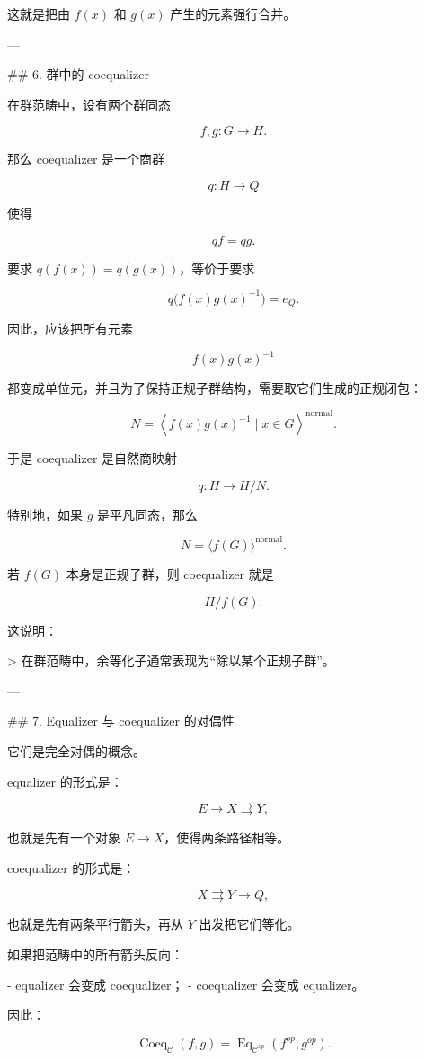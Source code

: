 \documentclass{ctexart}
\newcommand{\normal}{\mathrm{normal}}
\begin{document}
\begin{markdown}
这就是把由 $f(x)$ 和 $g(x)$ 产生的元素强行合并。

---

## 6. 群中的 coequalizer

在群范畴中，设有两个群同态

$$
f,g:G\to H.
$$

那么 coequalizer 是一个商群

$$
q:H\to Q
$$

使得

$$
qf=qg.
$$

要求 $q(f(x))=q(g(x))$，等价于要求

$$
q\bigl(f(x)g(x)^{-1}\bigr)=e_Q.
$$

因此，应该把所有元素

$$
f(x)g(x)^{-1}
$$

都变成单位元，并且为了保持正规子群结构，需要取它们生成的正规闭包：

$$
N=\left\langle f(x)g(x)^{-1}\mid x\in G\right\rangle^{\normal}.
$$

于是 coequalizer 是自然商映射

$$
q:H\to H/N.
$$

特别地，如果 $g$ 是平凡同态，那么

$$
N=\langle f(G)\rangle^{\normal}.
$$

若 $f(G)$ 本身是正规子群，则 coequalizer 就是

$$
H/f(G).
$$

这说明：

> 在群范畴中，余等化子通常表现为“除以某个正规子群”。

---

## 7. Equalizer 与 coequalizer 的对偶性

它们是完全对偶的概念。

equalizer 的形式是：

$$
E\longrightarrow X\rightrightarrows Y,
$$

也就是先有一个对象 $E\to X$，使得两条路径相等。

coequalizer 的形式是：

$$
X\rightrightarrows Y\longrightarrow Q,
$$

也就是先有两条平行箭头，再从 $Y$ 出发把它们等化。

如果把范畴中的所有箭头反向：

- equalizer 会变成 coequalizer；
- coequalizer 会变成 equalizer。

因此：

$$\operatorname{Coeq}_{\mathcal C}(f,g) = \operatorname{Eq}_{\mathcal C^{op}}(f^{op},g^{op}).
$$


\end{markdown}
\end{document}
